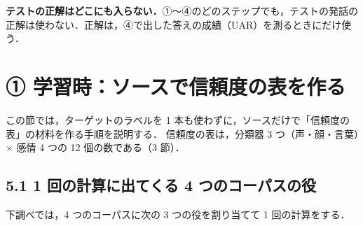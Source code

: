\documentclass[a4paper,11pt]{ltjsarticle}
\begin{document}
\begin{chui}
\textbf{テストの正解はどこにも入らない．}①〜④のどのステップでも，テストの発話の正解は使わない．正解は，④で出した答えの成績（UAR）を測るときにだけ使う．
\end{chui}

\section{① 学習時：ソースで信頼度の表を作る}

この節では，ターゲットのラベルを 1 本も使わずに，ソースだけで「信頼度の表」の材料を作る手順を説明する．
信頼度の表は，分類器 3 つ（声・顔・言葉）× 感情 4 つの 12 個の数である（3 節）．

\subsection*{5.1 1 回の計算に出てくる 4 つのコーパスの役}

下調べでは，4 つのコーパスに次の 3 つの役を割り当てて 1 回の計算をする．
\end{document}
